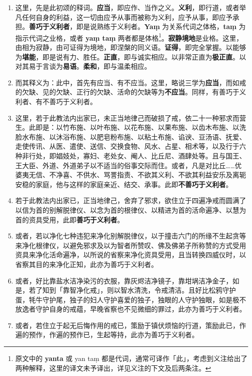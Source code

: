 \begin{enumerate}\item 这里，先是此初颂的释词。\textbf{应当}，即应作、当作之义。\textbf{义利}，即行道，或者举凡任何自身的利益，这一切由应予从事而被称为义利，应予从事，即应予承担。\textbf{善巧于义利者}，即是说熟练于义利者。\textbf{Yaṃ} 为关系代词之体格，\textbf{taṃ} 为指示代词之业格，或者 \textbf{yaṃ taṃ} 两者都是体格\footnote{原文中的 \textbf{yanta} 或 yan taṃ 都是代词，通常可译作「此」，考虑到义注给出了两种解释，这里的译文未予译出，详见义注的下文及后两条注。}。\textbf{寂静境地}是业格。这里，由相为寂静，由可证得为境地，即涅槃的同义语。\textbf{证得}，即完全掌握。以能够为\textbf{堪能}，即是说有力、胜任。\textbf{正直}，即与诚实相应。以非常正直为\textbf{极正直}。以对其易于言谈为\textbf{易语}。\textbf{柔和}，即与温柔相应。
\item 而其释义为：此中，首先有应当、有不应当。这里，略说三学为\textbf{应当}，而如戒的欠缺、见的欠缺、正行的欠缺、活命的欠缺等为\textbf{不应当}。同样，有善巧于义利者、有不善巧于义利者。
\item 这里，若于此教法内出家已，未正当地律己而破损了戒，依二十一种邪求而营生。此即是：以竹布施、以叶布施、以花布施、以果布施、以齿木布施、以洗脸水布施、以沐浴布施、以肥皂粉布施、以粘土布施、谄谀、豆汤语、抚爱、走使传讯、从医、遣使、送信、交换食物、风水、占星、相术等，以及行于六种非行处，即娼妓处，寡妇、老处女、阉人、比丘尼、酒肆处等。且与国王、王大臣、外道、外道弟子以不适当的俗事交际而住。或者，凡是对比丘……优婆夷无信、不净喜、不供水、骂詈指责、不欲其义利、不欲其利益安乐及离轭安稳的家庭，他与这样的家庭亲近、结交、承事。此即\textbf{不善巧于义利者}。
\item 若于此教法内出家已，正当地律己，舍弃了邪求，欲住立于四遍净戒而圆满了以信为首的别解脱律仪、以念为首的根律仪、以精进为首的活命遍净、以慧为首的资具受用，此即\textbf{善巧于义利者}。
\item 或者，若以净化七种违犯来净化别解脱律仪，以于撞击六门的所缘不生起贪等来净化根律仪，以避免邪求及以为智者所赞叹、佛及佛弟子所称赞的方式受用资具来净化活命遍净，以所说的省察来净化资具受用，且当转换四威仪时，以省察其目的来净化正知，此亦为善巧于义利者。
\item 或者，好比靠盐水洁净染污的衣服，靠灰烬洁净镜子，靠坩埚洁净金子，如是，若了知到「靠智净化戒」，则以智水清洗，令戒清洁。且好比松鸦守护蛋，牦牛守护尾，独子的妇人守护喜爱的独子，独眼的人守护独眼，如是极不放逸者守护自身的戒蕴，早晚省察也不见微细的罪过，此亦为善巧于义利者。
\item 或者，若住立于起无后悔作用的戒已，策励于镇伏烦恼的行道，策励此已，作遍的预作，作遍的预作已，生起等持，此亦为善巧于义利者。

\end{enumerate}

